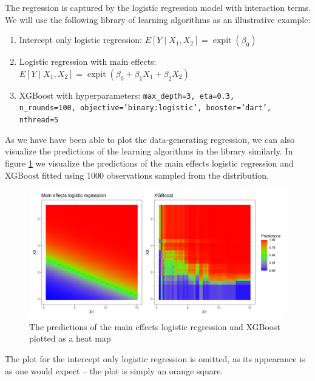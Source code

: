 \documentclass[11pt, a4paper]{article}
\theoremstyle{definition}
\theoremstyle{remark}
\DeclareMathOperator{\expit}{expit}
\begin{document}
The regression is captured by the logistic regression model with interaction terms. We will use the following library of learning algorithms as an illustrative example:
\begin{enumerate}
    \item Intercept only logistic regression: $E[Y \mid X_1, X_2] = \expit(\beta_0)$
    \item Logistic regression with main effects: $E[Y \mid X_1, X_2] = \expit(\beta_0 + \beta_1 X_1 + \beta_2 X_2)$
    \item XGBoost with hyperparameters: \texttt{max\_depth=3, eta=0.3,\\ n\_rounds=100, objective='binary:logistic', booster='dart', nthread=5}
\end{enumerate}
As we have have been able to plot the data-generating regression, we can also visualize the predictions of the learning algorithms in the library similarly. In figure \ref{fig:predictpar} we visualize the predictions of the main effects logistic regression and XGBoost fitted using 1000 observations sampled from the distribution. 
\begin{figure}
    \centering
    \includegraphics[width=\textwidth]{figures/predictpar.png}
    \caption{The predictions of the main effects logistic regression and XGBoost plotted as a heat map}
    \label{fig:predictpar}
\end{figure}
The plot for the intercept only logistic regression is omitted, as its appearance is as one would expect -- the plot is simply an orange square.
\end{document}
